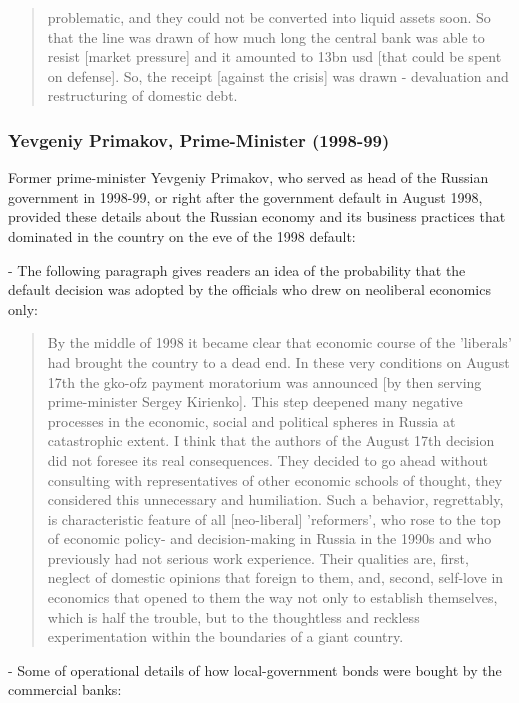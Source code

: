 \begin{quote}
problematic, and they could not be converted into liquid assets soon. So that the line was drawn of how much long the central bank was able to resist [market pressure] and it amounted to 13bn \ac{usd} [that could be spent on defense]. So, the receipt [against the crisis] was drawn - devaluation and restructuring of domestic debt.
\end{quote}

\subsubsection*{Yevgeniy Primakov, Prime-Minister (1998-99)}

Former prime-minister Yevgeniy Primakov, who served as head of the Russian government in 1998-99, or right after the government default in August 1998, provided these details about the Russian economy and its business practices that dominated in the country on the eve of the 1998 default:

- The following paragraph gives readers an idea of the probability that the default decision was adopted by the officials who drew on neoliberal economics only:

\begin{quote}
By the middle of 1998 it became clear that economic course of the 'liberals' had brought the country to a dead end. In these very conditions on August 17th the \ac{gko}-\ac{ofz} payment moratorium was announced [by then serving prime-minister Sergey Kirienko]. This step deepened many negative processes in the economic, social and political spheres in Russia at catastrophic extent. I think that the authors of the August 17th decision did not foresee its real consequences. They decided to go ahead without consulting with representatives of other economic schools of thought, they considered this unnecessary and humiliation. Such a behavior, regrettably, is characteristic feature of all [neo-liberal] 'reformers', who rose to the top of economic policy- and decision-making in Russia in the 1990s and who previously had not serious work experience. Their qualities are, first, neglect of domestic opinions that foreign to them, and, second, self-love in economics that opened to them the way not only to establish themselves, which is half the trouble, but to the thoughtless and reckless experimentation within the boundaries of a giant country.  \citep[p.~32]{primakov2002}
\end{quote}

- Some of operational details of how local-government bonds were bought by the commercial banks:

